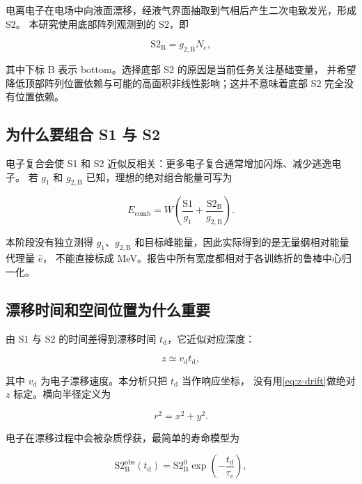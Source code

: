 \documentclass[UTF8,12pt,a4paper,oneside,fontset=none]{ctexart}
\numberwithin{equation}{section}
\newcommand{\Sone}{\mathrm{S1}}
\newcommand{\StwoB}{\mathrm{S2}_{\mathrm{B}}}
\newcommand{\Erel}{\hat e}
\begin{document}
电离电子在电场中向液面漂移，经液气界面抽取到气相后产生二次电致发光，形成 S2。
本研究使用底部阵列观测到的 S2，即

\begin{equation}
\StwoB=g_{2,\mathrm B}N_e,
\label{eq:s2}
\end{equation}

其中下标 \(\mathrm B\) 表示 bottom。选择底部 S2 的原因是当前任务关注基础变量，
并希望降低顶部阵列位置依赖与可能的高面积非线性影响；这并不意味着底部 S2 完全没有位置依赖。

\subsection{为什么要组合 S1 与 S2}

电子复合会使 S1 和 S2 近似反相关：更多电子复合通常增加闪烁、减少逃逸电子。
若 \(g_1\) 和 \(g_{2,\mathrm B}\) 已知，理想的绝对组合能量可写为

\begin{equation}
E_{\mathrm{comb}}
=
W\left(
\frac{\Sone}{g_1}
+
\frac{\StwoB}{g_{2,\mathrm B}}
\right).
\label{eq:combined-energy}
\end{equation}

本阶段没有独立测得 \(g_1\)、\(g_{2,\mathrm B}\) 和目标峰能量，因此实际得到的是无量纲相对能量代理量 \(\Erel\)，
不能直接标成 MeV。报告中所有宽度都相对于各训练折的鲁棒中心归一化。

\subsection{漂移时间和空间位置为什么重要}

由 S1 与 S2 的时间差得到漂移时间 \(t_{\mathrm d}\)，它近似对应深度：

\begin{equation}
z\simeq v_{\mathrm d}t_{\mathrm d},
\label{eq:z-drift}
\end{equation}

其中 \(v_{\mathrm d}\) 为电子漂移速度。本分析只把 \(t_{\mathrm d}\) 当作响应坐标，
没有用\cref{eq:z-drift}做绝对 \(z\) 标定。横向半径定义为

\begin{equation}
r^2=x^2+y^2.
\label{eq:r2}
\end{equation}

电子在漂移过程中会被杂质俘获，最简单的寿命模型为

\begin{equation}
\StwoB^{\mathrm{obs}}(t_{\mathrm d})
=
\StwoB^{0}
\exp\left(-\frac{t_{\mathrm d}}{\tau_e}\right),
\label{eq:lifetime}
\end{equation}
\end{document}
